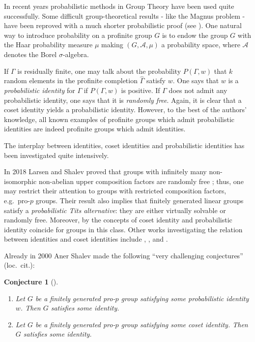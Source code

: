 \documentclass[a4paper,10pt]{amsart}
\theoremstyle{plain}
\newtheorem*{conjecture*}{Conjecture}
\theoremstyle{definition}
\numberwithin{equation}{section}
\newcommand{\comm}[1]{}
\begin{document}
In recent years probabilistic methods in Group Theory have been  used quite successfully. Some difficult group-theoretical results - like the Magnus problem - have been reproved with a much shorter probabilistic proof (see \cite{DPSS}).  One natural way to introduce probability on a profinite group $G$ is to endow the group $G$ with the Haar probability measure $\mu$ making $(G,\mathcal{A},\mu)$ a probability space, where
$\mathcal{A}$ denotes the Borel $\sigma$-algebra.

If $\Gamma$ is residually finite, one may talk about the probability $P(\Gamma,w)$ that $k$ random elements in the profinite completion $\widehat{\Gamma}$ satisfy $w$. One  says that $w$ is a \emph{probabilistic identity} for $\Gamma$ if $P(\Gamma,w)$ is positive. If $\Gamma$ does not admit any probabilistic identity, one says that it is \emph{randomly free}. Again, it is clear that a coset identity yields a probabilistic identity. However, to the best of the authors' knowledge, all known examples of profinite groups which admit probabilistic identities are indeed profinite groups which admit identities. 

The interplay between identities, coset identities and probabilistic identities has been investigated 
quite intensively.
\comm{several times in the literature.} 
In 2018 Larsen and Shalev proved that groups with infinitely many non-isomorphic non-abelian upper composition factors are randomly free \cite[Thm.~1.5]{LS18}; thus, one may restrict their attention to groups with restricted composition factors, e.g.\ pro-$p$ groups. Their result also implies that finitely generated linear groups satisfy a \emph{probabilistic Tits alternative}: they are either virtually solvable or randomly free. Moreover, by \cite[Theorem 1.4]{LS16} the concepts of coset identity and probabilistic identity coincide for groups in this class. Other works investigating the relation between identities and coset identities include \cite{WZ}, \cite{CM07}, \cite{BG} \cite{Ni} and \cite{LP00}.

Already in 2000 Aner Shalev made the following ``very challenging conjectures'' (loc.\ cit.):

\begin{conjecture*}[{\cite[Conjectures 2 and 3, pg.~7]{Sh00}}] \qquad

    \begin{enumerate}
        \item[(a)]\label{conj:a} Let $G$ be a finitely generated pro-$p$ group satisfying some probabilistic identity $w$. Then $G$ satisfies some identity.
        \item[(b)]\label{conj:b} Let $G$ be a finitely generated pro-$p$ group satisfying some coset identity. Then $G$ satisfies some identity.
    \end{enumerate}
\end{conjecture*}
\end{document}
